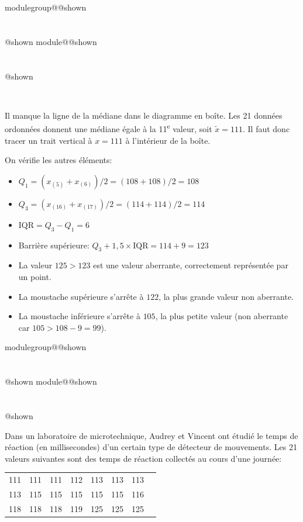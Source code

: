 \documentclass{Evaluation}
\makeatletter
\newcommand{\currentmodulekey}{}
\newcommand{\currentmoduletitle}{}
\newcommand{\currentgroupkey}{}
\newcommand{\currentgrouptitle}{}
\newcommand{\showmoduleifneeded}{%
  \ifx\currentgroupkey\empty\else
    \expandafter\ifx\csname modulegroup@\currentgroupkey @shown\endcsname\relax
      \section*{\currentgrouptitle}%
      \expandafter\gdef\csname modulegroup@\currentgroupkey @shown\endcsname{1}%
    \fi
  \fi
  \expandafter\ifx\csname module@\currentmodulekey @shown\endcsname\relax
    \section*{\currentmoduletitle}%
    \expandafter\gdef\csname module@\currentmodulekey @shown\endcsname{1}%
  \fi
}
\newenvironment{H24}{\showmoduleifneeded}{}
\newenvironment{H26r}{\showmoduleifneeded}{}
\makeatother
\begin{document}
\begin{questions}
\begin{H26r}
\begin{center}
\\
	\end{center}

\begin{solution}
    Il manque la ligne de la médiane dans le diagramme en boîte. Les 21 données ordonnées donnent une médiane égale à la 11\textsuperscript{e} valeur, soit $\tilde{x}=111$. Il faut donc tracer un trait vertical à $x=111$ à l'intérieur de la boîte.

    On vérifie les autres éléments:
    \begin{itemize}
        \item $Q_1 = (x_{(5)}+x_{(6)})/2=(108+108)/2=108$ \checkmark
        \item $Q_3 = (x_{(16)}+x_{(17)})/2=(114+114)/2=114$ \checkmark
        \item $\text{IQR}=Q_3 - Q_1 = 6$
        \item Barrière supérieure: $Q_3+1{,}5\times\text{IQR}=114+9=123$
        \item La valeur $125 > 123$ est une valeur aberrante, correctement représentée par un point. \checkmark
        \item La moustache supérieure s'arrête à $122$, la plus grande valeur non aberrante. \checkmark
        \item La moustache inférieure s'arrête à $105$, la plus petite valeur (non aberrante car $105 > 108-9=99$). \checkmark
    \end{itemize}
\end{solution}
\end{H26r}

\begin{H24}
\question {} %
Dans un laboratoire de microtechnique, Audrey et Vincent ont étudié le temps de réaction (en millisecondes) d'un certain type de détecteur de mouvements. Les 21 valeurs suivantes sont des temps de réaction collectés au cours d'une journée:

\begin{center}
\begin{tabular}{  c c c c c c c c }
111  &111  &111  &112  &113  &113  &113 \\
113 &115  &115  &115  &115 &115 & 116 \\
118 & 118 & 118 & 119 & 125 &125 & 125\\
\end{tabular}
\end{center}


\end{H24}
\end{questions}
\end{document}
